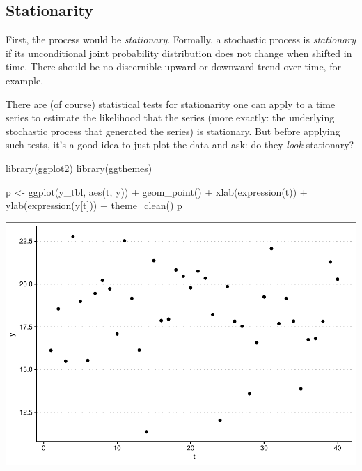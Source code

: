 \documentclass[
]{book}
\newenvironment{Shaded}{\begin{snugshade}}{\end{snugshade}}
\newcommand{\FunctionTok}[1]{\textcolor[rgb]{0.00,0.00,0.00}{#1}}
\newcommand{\NormalTok}[1]{#1}
\newcommand{\OtherTok}[1]{\textcolor[rgb]{0.56,0.35,0.01}{#1}}
\newcommand{\SpecialCharTok}[1]{\textcolor[rgb]{0.00,0.00,0.00}{#1}}
\begin{document}
\hypertarget{stationarity}{%
\subsection{Stationarity}\label{stationarity}}

First, the process would be \emph{stationary}. Formally, a stochastic process is \emph{stationary} if its unconditional joint probability distribution does not change when shifted in time. There should be no discernible upward or downward trend over time, for example.

There are (of course) statistical tests for stationarity one can apply to a time series to estimate the likelihood that the series (more exactly: the underlying stochastic process that generated the series) is stationary. But before applying such tests, it's a good idea to just plot the data and ask: do they \emph{look} stationary?

\begin{Shaded}
\begin{Highlighting}[]
\FunctionTok{library}\NormalTok{(ggplot2)}
\FunctionTok{library}\NormalTok{(ggthemes)}

\NormalTok{p }\OtherTok{\textless{}{-}} \FunctionTok{ggplot}\NormalTok{(y\_tbl, }\FunctionTok{aes}\NormalTok{(t, y)) }\SpecialCharTok{+} \FunctionTok{geom\_point}\NormalTok{() }\SpecialCharTok{+} \FunctionTok{xlab}\NormalTok{(}\FunctionTok{expression}\NormalTok{(t)) }\SpecialCharTok{+} \FunctionTok{ylab}\NormalTok{(}\FunctionTok{expression}\NormalTok{(y[t])) }\SpecialCharTok{+} \FunctionTok{theme\_clean}\NormalTok{()}
\NormalTok{p}
\end{Highlighting}
\end{Shaded}

\includegraphics{graphics/unnamed-chunk-57-1.pdf}
\end{document}
